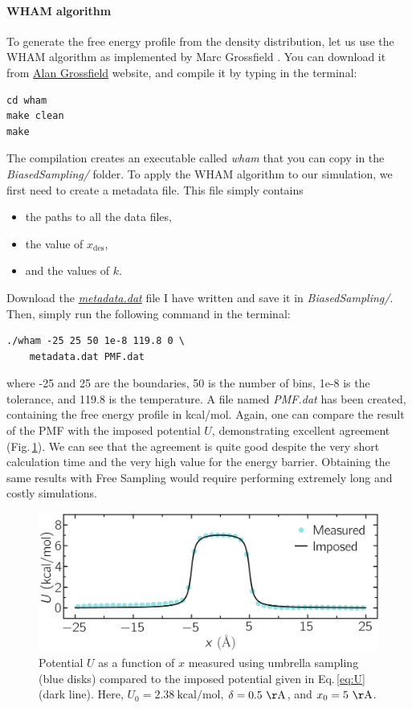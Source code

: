 \documentclass[9pt,tutorial]{livecoms}
\begin{document}
\paragraph{WHAM algorithm}
\noindent To generate the free energy profile from the density distribution, let us use the WHAM algorithm as implemented by Marc Grossfield \cite{grossfieldimplementation}. You can download it from \href{http://membrane.urmc.rochester.edu/?page_id=126}{Alan Grossfield} website, and compile it by typing in the terminal: 
{\normalsize \begin{verbatim}
cd wham
make clean
make
\end{verbatim}}
\noindent The compilation creates an executable called \textit{wham} that you can copy in the \textit{BiasedSampling/} folder. To apply the WHAM algorithm to our simulation, we first need to create a metadata file. This file simply contains 
\begin{itemize}
\item the paths to all the data files,
\item the value of $x_\text{des}$,
\item and the values of $k$.
\end{itemize}
Download the \href{https://raw.githubusercontent.com/lammpstutorials/lammpstutorials-article/main/files/tutorial7/metadata.dat}{\textit{metadata.dat}} file I have written and save it in \textit{BiasedSampling/}. Then, simply run the following command in the terminal:
{\normalsize \begin{verbatim}
./wham -25 25 50 1e-8 119.8 0 \
    metadata.dat PMF.dat
\end{verbatim}}
where -25 and 25 are the boundaries, 50 is the number of bins, 1e-8 is the tolerance, and 119.8 is the temperature. A file named
\textit{PMF.dat} has been created, containing the free energy profile in kcal/mol. Again, one can compare the result of the PMF with the imposed potential $U$, demonstrating excellent agreement (Fig.\,\ref{fig:US-freenergy}). We can see that the agreement is quite good despite the very short calculation time and the very high value for the energy barrier. Obtaining the same results with Free Sampling would require performing extremely long and costly simulations.

\begin{figure}
\centering
\includegraphics[width=\linewidth]{US-freenergy}
\caption{Potential $U$ as a function of $x$ measured using umbrella sampling (blue disks) compared to the imposed potential given in Eq.\,\eqref{eq:U} (dark line). Here, $U_0 = 2.38~\text{kcal/mol}$, $\delta = 0.5~\mathrm{\AA{}}$, and $x_0 = 5~\mathrm{\AA{}}$.}
\label{fig:US-freenergy}
\end{figure}
\end{document}

